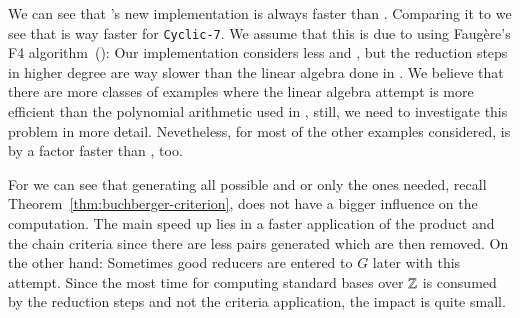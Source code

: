 We can see that \singular's new implementation is always faster than \macaulay.
Comparing it to \magma we see that \magma is way faster for \texttt{Cyclic-7}.
We assume that this is due to \magma using Faug\`ere's F4
algorithm~(\cite{fF41999}): Our implementation considers less \spts and \gpts, but
the reduction steps in higher degree are way slower than the linear algebra done
in \magma. We believe that there are more classes of examples where the linear
algebra attempt is more efficient than the polynomial arithmetic used in
\singular, still, we need to investigate this problem in more detail.
Nevetheless, for most of the other examples considered, \singular is by a
factor faster than \magma, too.

For \singular we can see that generating all possible \spts and \gpts or only
the ones needed, recall Theorem~\ref{thm:buchberger-criterion}, does not have a
bigger influence on the computation. The main speed up lies in a faster
application of the product and the chain criteria since there are less pairs
generated which are then removed. On the other hand: Sometimes good reducers
are entered to $G$ later with this attempt. Since the most time for computing
standard bases over $\mathbb{Z}$ is consumed by the reduction steps and not the
criteria application, the impact is quite small.

